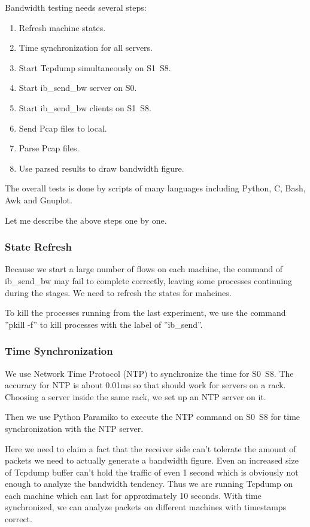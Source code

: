 \documentclass{article}
\begin{document}
Bandwidth testing needs several steps:
\begin{enumerate}
	\item Refresh machine states.
	\item Time synchronization for all servers.
	\item Start Tcpdump simultaneously on S1~S8.
	\item Start ib\_send\_bw server on S0.
	\item Start ib\_send\_bw clients on S1~S8.
	\item Send Pcap files to local.
	\item Parse Pcap files.
	\item Use parsed results to draw bandwidth figure.
\end{enumerate}

The overall tests is done by scripts of many languages including Python, C, Bash, Awk and Gnuplot.

Let me describe the above steps one by one.

\subsubsection{State Refresh}

Because we start a large number of flows on each machine, the command of ib\_send\_bw may fail to complete correctly, leaving
some processes continuing during the stages. We need to refresh the states for mahcines.

To kill the processes running from the last experiment, we use the command ''pkill -f'' to kill processes with the label of ''ib\_send''.

\subsubsection{Time Synchronization}
We use Network Time Protocol (NTP) to synchronize the time for S0~S8.
The accuracy for NTP is about 0.01ms so that should work for servers on a rack.
Choosing a server inside the same rack, we set up an NTP server on it.

Then we use Python Paramiko to execute the NTP command on S0~S8 for time synchronization with the NTP server.

Here we need to claim a fact that the receiver side can't tolerate the amount of packets we need to actually generate a bandwidth figure.
Even an increased size of Tcpdump buffer can't hold the traffic of even 1 second which is obviously not enough to analyze the bandwidth tendency.
Thus we are running Tcpdump on each machine which can last for approximately 10 seconds.
With time synchronized, we can analyze packets on different machines with timestamps correct.
\end{document}
